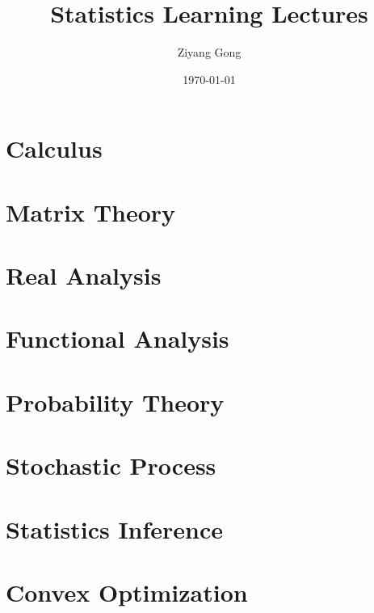 \documentclass[12pt]{prettybook}
\title{Statistics Learning Lectures}
\author{Ziyang Gong}
\date{\today}
\begin{document}
\frontmatter
\tableofcontents

\mainmatter
\part{Calculus}



\part{Matrix Theory}


\part{Real Analysis}


\part{Functional Analysis}
\part{Probability Theory}






\part{Stochastic Process}




\part{Statistics Inference}





\part{Convex Optimization}




\end{document}

